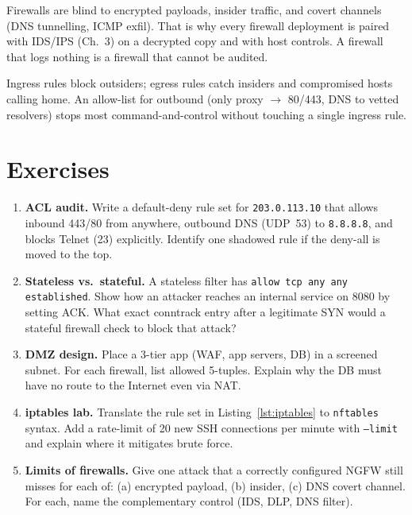 Firewalls are blind to encrypted payloads, insider traffic, and covert
channels (DNS tunnelling, ICMP exfil). That is why every firewall deployment
is paired with IDS/IPS (Ch.~3) on a decrypted copy and with host controls.
A firewall that logs nothing is a firewall that cannot be audited.

\begin{remark}\label{rem:egress}
Ingress rules block outsiders; egress rules catch insiders and compromised
hosts calling home. An allow-list for outbound (only proxy $\to$ 80/443, DNS
to vetted resolvers) stops most command-and-control without touching a single
ingress rule.
\end{remark}

\section{Exercises}\label{sec:ch02-exercises}
\begin{enumerate}[label=E2.\arabic*, leftmargin=*, itemsep=0.6em]
    \item \textbf{ACL audit.} Write a default-deny rule set for \texttt{203.0.113.10}
    that allows inbound 443/80 from anywhere, outbound DNS (UDP~53) to
    \texttt{8.8.8.8}, and blocks Telnet (23) explicitly. Identify one shadowed
    rule if the deny-all is moved to the top.
    \item \textbf{Stateless vs.\ stateful.} A stateless filter has \texttt{allow tcp any any established}.
    Show how an attacker reaches an internal service on 8080 by setting ACK.
    What exact conntrack entry after a legitimate SYN would a stateful firewall
    check to block that attack?
    \item \textbf{DMZ design.} Place a 3-tier app (WAF, app servers, DB) in a
    screened subnet. For each firewall, list allowed 5-tuples. Explain why the
    DB must have no route to the Internet even via NAT.
    \item \textbf{iptables lab.} Translate the rule set in Listing~\ref{lst:iptables}
    to \texttt{nftables} syntax. Add a rate-limit of 20 new SSH connections per
    minute with \texttt{--limit} and explain where it mitigates brute force.
    \item \textbf{Limits of firewalls.} Give one attack that a correctly configured
    NGFW still misses for each of: (a) encrypted payload, (b) insider, (c) DNS
    covert channel. For each, name the complementary control (IDS, DLP, DNS filter).
\end{enumerate}


